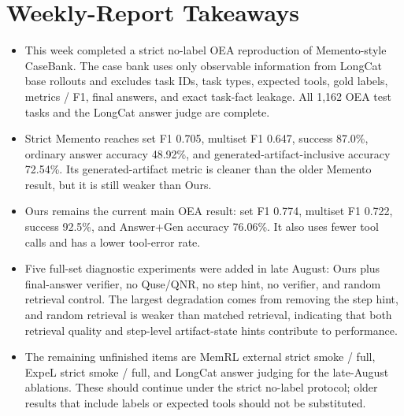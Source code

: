\documentclass[11pt]{article}
\begin{document}
\section{Weekly-Report Takeaways}

\begin{itemize}
    \item This week completed a strict no-label OEA reproduction of Memento-style CaseBank. The case bank uses only observable information from LongCat base rollouts and excludes task IDs, task types, expected tools, gold labels, metrics / F1, final answers, and exact task-fact leakage. All 1,162 OEA test tasks and the LongCat answer judge are complete.
    \item Strict Memento reaches set F1 0.705, multiset F1 0.647, success 87.0\%, ordinary answer accuracy 48.92\%, and generated-artifact-inclusive accuracy 72.54\%. Its generated-artifact metric is cleaner than the older Memento result, but it is still weaker than Ours.
    \item Ours remains the current main OEA result: set F1 0.774, multiset F1 0.722, success 92.5\%, and Answer+Gen accuracy 76.06\%. It also uses fewer tool calls and has a lower tool-error rate.
    \item Five full-set diagnostic experiments were added in late August: Ours plus final-answer verifier, no Quse/QNR, no step hint, no verifier, and random retrieval control. The largest degradation comes from removing the step hint, and random retrieval is weaker than matched retrieval, indicating that both retrieval quality and step-level artifact-state hints contribute to performance.
    \item The remaining unfinished items are MemRL external strict smoke / full, ExpeL strict smoke / full, and LongCat answer judging for the late-August ablations. These should continue under the strict no-label protocol; older results that include labels or expected tools should not be substituted.
\end{itemize}
\end{document}
